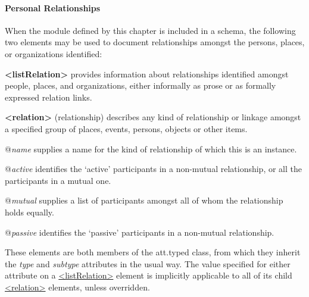 \paragraph[{Personal Relationships}]{Personal Relationships}\label{NDPERSREL}\par
When the module defined by this chapter is included in a schema, the following two elements may be used to document relationships amongst the persons, places, or organizations identified: 
\begin{sansreflist}
  
\item [\textbf{<listRelation>}] provides information about relationships identified amongst people, places, and organizations, either informally as prose or as formally expressed relation links.
\item [\textbf{<relation>}] (relationship) describes any kind of relationship or linkage amongst a specified group of places, events, persons, objects or other items.\hfil\\[-10pt]\begin{sansreflist}
    \item[@{\itshape name}]
  supplies a name for the kind of relationship of which this is an instance.
    \item[@{\itshape active}]
  identifies the ‘active’ participants in a non-mutual relationship, or all the participants in a mutual one.
    \item[@{\itshape mutual}]
  supplies a list of participants amongst all of whom the relationship holds equally.
    \item[@{\itshape passive}]
  identifies the ‘passive’ participants in a non-mutual relationship.
\end{sansreflist}  
\end{sansreflist}
 These elements are both members of the \textsf{att.typed} class, from which they inherit the {\itshape type} and {\itshape subtype} attributes in the usual way. The value specified for either attribute on a \hyperref[TEI.listRelation]{<listRelation>} element is implicitly applicable to all of its child \hyperref[TEI.relation]{<relation>} elements, unless overridden.\par
